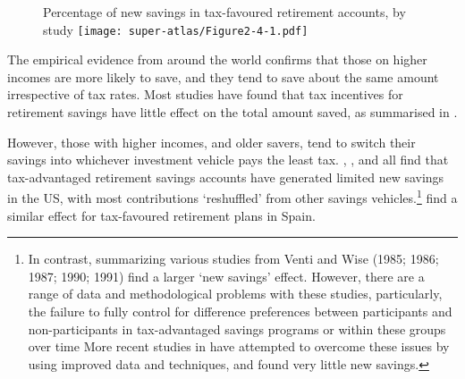 \begin{figure}
%
{Percentage of new savings in tax-favoured retirement accounts, by study}\label{fig:SUPER-2-4}
\texttt{[image: super-atlas/Figure2-4-1.pdf]}

\end{figure}

The empirical evidence from around the world confirms that those on higher incomes are more likely to save, and they tend to save about the same amount irrespective of tax rates. Most studies have found that tax incentives for retirement savings have little effect on the total amount saved, as summarised in .

However, those with higher incomes, and older savers, tend to switch their savings into whichever investment vehicle pays the least tax.  \textcite{EngenGale2000}, \textcite{AttanasioBanksWakefield2004}, and \textcite{Benjamin2003} all find that tax-advantaged retirement savings accounts have generated limited new savings in the US, with most contributions ‘reshuffled’ from other savings vehicles.\footnote{In contrast, \textcite{PoterbaVentiWise1996} summarizing various studies from Venti and Wise (1985; 1986; 1987; 1990; 1991) find a larger ‘new savings’ effect. 
However, there are a range of data and methodological problems with these studies, particularly, the failure to fully control for difference preferences between participants and non-participants in tax-advantaged savings programs or within these groups over time \textcite{EngenGaleScholz1996} More recent studies in \textcites{Benjamin2003}{EngenGale2000}  have attempted to overcome these issues by using improved data and techniques, and found very little new savings.}    \textcite{AyusoJimenoVillanueva2007} find a similar effect for tax-favoured retirement plans in Spain. 

